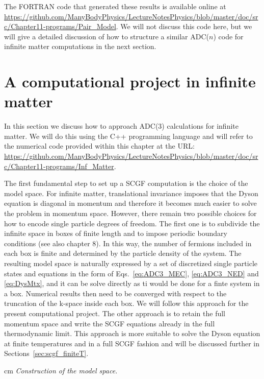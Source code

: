 The FORTRAN code that generated these results is available online at  {\sloppy  \url{https://github.com/ManyBodyPhysics/LectureNotesPhysics/blob/master/doc/src/Chapter11-programs/Pair_Model}}. We will not discuss this code here, but we will give a detailed discussion of how to structure a similar ADC($n$) code for infinite matter computations in the next section.


\section{A computational project in infinite matter}
\label{sec:scgf_comp}


In this section we discuss how to approach  ADC(3) calculations for infinite matter. We will do this
using the C++ programming language and will refer to the numerical code provided within this chapter at the {\sloppy
URL:  \url{https://github.com/ManyBodyPhysics/LectureNotesPhysics/blob/master/doc/src/Chapter11-programs/Inf_Matter}.}

\iffalse
The first fundamental step  to set up a SCGF computation is the choice of the model space. For
infinite matter, translational invariance imposes that the Dyson equation is diagonal in momentum  and
therefore it becomes much easier to solve the problem in momentum space. However, there remain two possible
choices for how to encode single particle degrees of freedom.
The first one is to subdivide the infinite space in  boxes of finite length  and to impose periodic boundary conditions
(see also chapter 8). In this way, the number of fermions included in each box is finite and determined by the particle
density of the system. The resulting model space is naturally expressed by a set of discretized single particle
states and equations in the form of Eqs.~\eqref{eq:ADC3_MEC}, \eqref{eq:ADC3_NED} and \eqref{eq:DysMtx}, and it
can be solve directly as ti would be done for a finte system in a box.  Numerical results then need to be converged
with respect to the truncation of the k-space inside each box.   We will follow this approach for the present
computational project.
The other approach is to retain the full momentum space and write the SCGF equations already in the full
thermodynamic limit. This approach is more suitable to solve the Dyson equation at finite temperatures and
in a full SCGF fashion and will be discussed further in Sections~\ref{sec:scgf_finiteT}. %


 cm
{\em Construction of the model space.}


